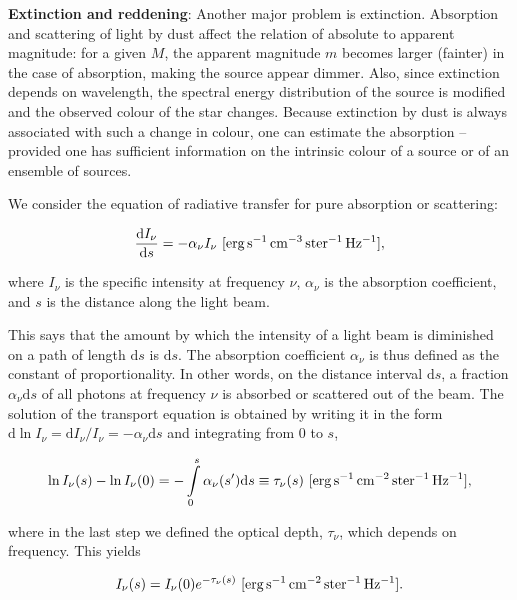 \documentclass[a4paper,11pt]{article}
\begin{document}
{\noindent}\textbf{Extinction and reddening}: Another major problem is extinction. Absorption and scattering of light by dust affect the relation of absolute to apparent magnitude: for a given $M$, the apparent magnitude $m$ becomes larger (fainter) in the case of absorption, making the source appear dimmer. Also, since extinction depends on wavelength, the spectral energy distribution of the source is modified and the observed colour of the star changes. Because extinction by dust is always associated with such a change in colour, one can estimate the absorption -- provided one has sufficient information on the intrinsic colour of a source or of an ensemble of sources.

{\noindent}We consider the equation of radiative transfer for pure absorption or scattering:

\begin{align*}
    \frac{\mathrm{d}I_\nu}{\mathrm{d}s} = -\alpha_\nu I_\nu ~ [\rm erg\,s^{-1}\,cm^{-3}\,ster^{-1}\,Hz^{-1}],
\end{align*}

{\noindent}where $I_\nu$ is the specific intensity at frequency $\nu$, $\alpha_\nu$ is the absorption coefficient, and $s$ is the distance along the light beam.

{\noindent}This says that the amount by which the intensity of a light beam is diminished on a path of length $\mathrm{d}s$ is $\mathrm{d}s$. The absorption coefficient $\alpha_\nu$ is thus defined as the constant of proportionality. In other words, on the distance interval $\mathrm{d}s$, a fraction $\alpha_\nu\mathrm{d}s$ of all photons at frequency $\nu$ is absorbed or scattered out of the beam. The solution of the transport equation is obtained by writing it in the form $\mathrm{d}\ln I_\nu=\mathrm{d}I_\nu/I_\nu=-\alpha_\nu\mathrm{d}s$ and integrating from $0$ to $s$,

\begin{align*}
    \ln I_\nu(s)-\ln I_\nu(0) = -\int\limits_0^s \alpha_\nu(s')\mathrm{d}s \equiv \tau_\nu(s) ~ [\rm erg\,s^{-1}\,cm^{-2}\,ster^{-1}\,Hz^{-1}],
\end{align*}

{\noindent}where in the last step we defined the optical depth, $\tau_\nu$, which depends on frequency. This yields

\begin{align*}
    I_\nu(s) = I_\nu(0)e^{-\tau_\nu(s)} ~ [\rm erg\,s^{-1}\,cm^{-2}\,ster^{-1}\,Hz^{-1}].
\end{align*}
\end{document}
